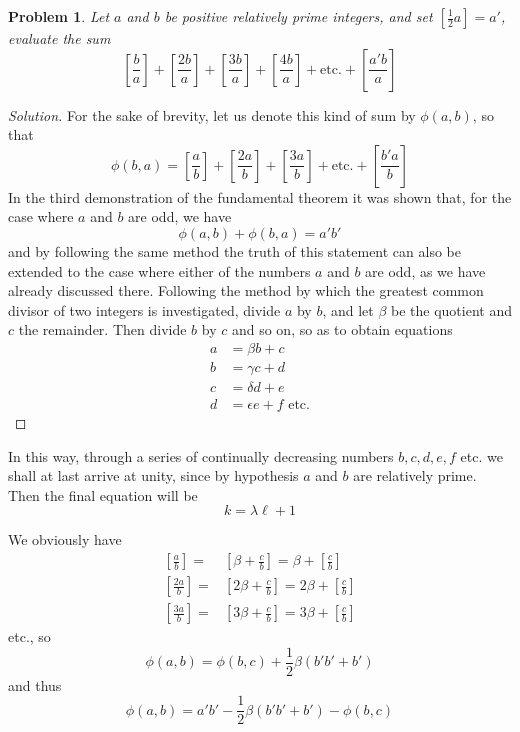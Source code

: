 \documentclass{book}
\theoremstyle{plain}
\newtheorem{problem}{Problem}
\theoremstyle{remark}
\begin{document}
\begin{problem} 
Let $a$ and $b$ be positive relatively prime integers, and set $[\tfrac{1}{2}a] = a'$, evaluate the sum
\[ \left[\frac{b}{a}\right] + \left[\frac{2b}{a}\right] + \left[\frac{3b}{a}\right] + \left[\frac{4b}{a}\right] + \textrm{etc.} + \left[\frac{a'b}{a}\right] \]
\end{problem}
\begin{proof}[Solution]  For the sake of brevity, let us denote this kind of sum by $\phi(a,b)$, so that 
\[ \phi(b,a) = \left[\frac{a}{b}\right] + \left[\frac{2a}{b}\right] + \left[\frac{3a}{b}\right]  + \textrm{etc.} + \left[\frac{b' a}{b}\right] \]
In the third demonstration of the fundamental theorem it was shown that, for the case where $a$ and $b$ are odd, we have 
\[ \phi(a,b) + \phi(b,a) = a'b' \]
and by following the same method the truth of this statement can also be extended to the case where either of the numbers $a$ and $b$ are odd, as we have already discussed there.  Following the method by which the greatest common divisor of two integers is investigated, divide $a$ by $b$, and let $\beta$ be the quotient and $c$ the remainder.  Then divide $b$ by $c$ and so on, so as to obtain equations
\begin{align*}
 a &= \beta b + c \\
b &= \gamma c + d \\
c &= \delta d + e \\
d &= \epsilon e + f \textrm{ etc.} \end{align*} \end{proof}
In this way, through a series of continually decreasing numbers $b, c, d, e, f$ etc. we shall at last arrive at unity, since by hypothesis $a$ and $b$ are relatively prime.  Then the final equation will be 
\[ k = \lambda \ell + 1 \]

We obviously have 
\begin{align*} 
\left[\frac{a}{b} \right] = &\left[ \beta + \frac{c}{b} \right] = \beta + \left[\frac{c}{b}\right]  \\
 \left[\frac{2a}{b} \right] = & \left[ 2\beta + \frac{c}{b} \right] = 2\beta + \left[\frac{c}{b}\right] \\
 \left[\frac{3a}{b} \right] = & \left[ 3\beta + \frac{c}{b} \right] = 3\beta + \left[\frac{c}{b}\right] 
 \end{align*}
 etc., so
 \[ \phi(a,b) = \phi(b,c) + \frac{1}{2}\beta (b'b'+b') \]
 and thus
 \[ \phi(a,b) = a'b' - \frac{1}{2}\beta (b'b'+b') - \phi(b,c) \]
 
\end{document}

